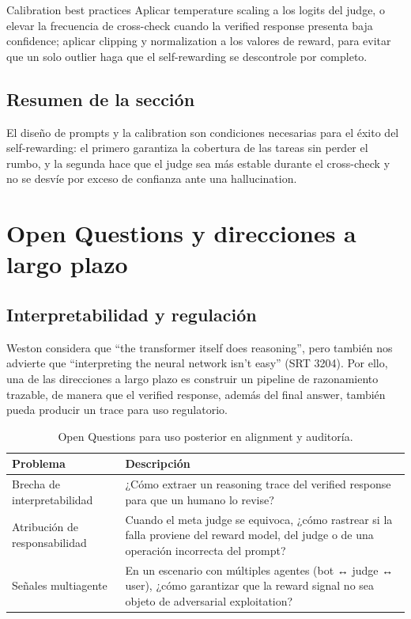 \documentclass[a4paper]{article}
\begin{document}
\begin{knowledgebox}{Calibration best practices}
Aplicar temperature scaling a los logits del judge, o elevar la frecuencia de cross-check cuando la verified response presenta baja confidence; aplicar clipping y normalization a los valores de reward, para evitar que un solo outlier haga que el self-rewarding se descontrole por completo.
\end{knowledgebox}

\subsection{Resumen de la sección}
El diseño de prompts y la calibration son condiciones necesarias para el éxito del self-rewarding: el primero garantiza la cobertura de las tareas sin perder el rumbo, y la segunda hace que el judge sea más estable durante el cross-check y no se desvíe por exceso de confianza ante una hallucination.
\section{Open Questions y direcciones a largo plazo}
\subsection{Interpretabilidad y regulación}
Weston considera que ``the transformer itself does reasoning'', pero también nos advierte que ``interpreting the neural network isn't easy'' (SRT 3204). Por ello, una de las direcciones a largo plazo es construir un pipeline de razonamiento trazable, de manera que el verified response, además del final answer, también pueda producir un trace para uso regulatorio.

\begin{table}[H]
\centering
\begin{tabular}{p{5cm}p{10cm}}
\toprule
Problema & Descripción \\
\midrule
Brecha de interpretabilidad & ¿Cómo extraer un reasoning trace del verified response para que un humano lo revise? \\
Atribución de responsabilidad & Cuando el meta judge se equivoca, ¿cómo rastrear si la falla proviene del reward model, del judge o de una operación incorrecta del prompt? \\
Señales multiagente & En un escenario con múltiples agentes (bot ↔ judge ↔ user), ¿cómo garantizar que la reward signal no sea objeto de adversarial exploitation? \\
\bottomrule
\end{tabular}
\caption{Open Questions para uso posterior en alignment y auditoría.}
\end{table}
\end{document}
